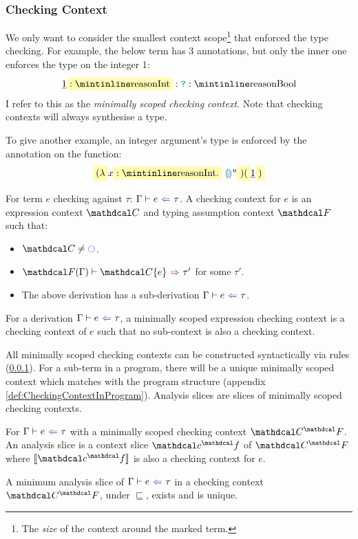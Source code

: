 \subsubsection{Checking Context}
\label{sec:CheckingContexts}
We only want to consider the smallest context scope\footnote{The \textit{size} of the context around the marked term.} that enforced the type checking. For example, the below term has 3 annotations, but only the inner one enforces the  type on the integer 1:
\[\underline{1} \hlcmaths[yellow!30]{: \code{Int}} : \dyn : \code{Bool}\]
I refer to this as the \textit{minimally scoped checking context}. Note that checking contexts will always synthesise a type. 

To give another example, an integer argument's type is enforced by the annotation on the function:
\[\hlcmaths[yellow!30]{(\lambda} x \hlcmaths[yellow!30]{: \code{Int}.}\ \hole^u\hlcmaths[yellow!30]{)(}\underline{1}\hlcmaths[yellow!30]{)}\]


\begin{definition}
\label{def:CheckingContext}
For term $e$ checking against $\tau$: $\analysis[\Gamma]{e}{\tau}$. A checking context for $e$ is an expression context $\C$ and typing assumption context $\F$ such that: 
\begin{itemize}
\item $\C \neq \cmark$.
\item $\synthesis[\F(\Gamma)]{\C\{e\}}{\tau'}$ for some $\tau'$.
\item The above derivation has a sub-derivation $\analysis[\Gamma]{e}{\tau}$.
\end{itemize}
\end{definition}
\begin{definition}
For a derivation $\analysis[\Gamma]{e}{\tau}$, a minimally scoped expression checking context is a checking context of $e$ such that no sub-context is also a checking context.
\end{definition}

All minimally scoped checking contexts can be constructed syntactically via rules (\cref{sec:CheckingContexts}). For a sub-term in a program, there will be a unique minimally scoped context which matches with the program structure (appendix \cref{def:CheckingContextInProgram}). Analysis slices are slices of minimally scoped checking contexts.
\begin{definition}\label{def:analysisslice}
For $\analysis{e}{\tau}$ with a minimally scoped checking context $\C^\F$. An analysis slice is a context slice $\Cs^\f$ of $\C^\F$ where $\type{\Cs^\f}$ is also a checking context for $e$.
\end{definition}
\begin{conjecture}\label{conj:AnalysisSliceUniqueness}
A minimum analysis slice of $\analysis{e}{\tau}$ in a checking context $\C^\F$, under $\sqsubseteq$, exists and is unique.
\end{conjecture}

